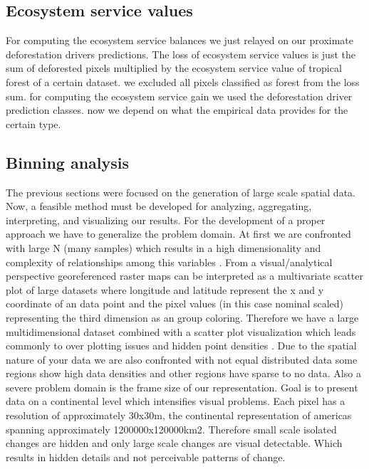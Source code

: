 	\subsection{Ecosystem service values}
			For computing the ecosystem service balances we just relayed on our proximate deforestation drivers predictions. The loss of ecosystem service values is just the sum of deforested pixels multiplied by the ecosystem service value of tropical forest of a certain dataset. we excluded all pixels classified as forest from the loss sum. for computing the ecosystem service gain we used the deforestation driver prediction classes. now we depend on what the empirical data provides for the certain type.

	\subsection{Binning analysis}
		The previous sections were focused on the generation of large scale spatial data. Now, a feasible method must be developed for analyzing, aggregating, interpreting, and visualizing our results. For the development of a proper approach we have to generalize the problem domain. At first we are confronted with large N (many samples) which results in a high dimensionality and complexity of relationships among this variables \citep{Carr1990}. From a visual/analytical perspective georeferenced raster maps can be interpreted as a multivariate scatter plot of large datasets where longitude and latitude represent the x and y coordinate of an data point and the pixel values (in this case nominal scaled) representing the third dimension as an group coloring. Therefore we have a large multidimensional dataset combined with a scatter plot visualization which leads commonly to over plotting issues and hidden point densities \citep{Carr1987}. Due to the spatial nature of your data we are also confronted with not equal distributed data some regions show high data densities and other regions have sparse to no data. Also a severe problem domain is the frame size of our representation. Goal is to present data on a continental level which intensifies visual problems. Each pixel has a resolution of approximately 30x30m, the continental representation of americas spanning approximately 1200000x120000km2. Therefore small scale isolated changes are hidden and only large scale changes are visual detectable. Which results in hidden details and not perceivable patterns of change.

